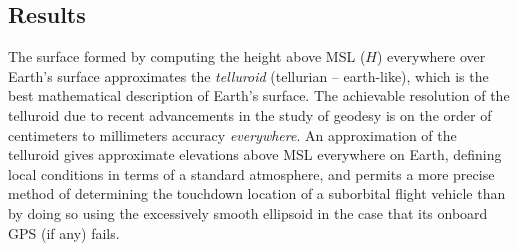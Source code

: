 \documentclass[11pt,dvipsnames]{thesis}
\begin{document}
\subsection{Results}
The surface formed by computing the height above MSL ($H$) everywhere over Earth's surface approximates the \textit{telluroid} (tellurian -- earth-like), which is the best mathematical description of Earth's surface. The achievable resolution of the telluroid due to recent advancements in the study of geodesy is on the order of centimeters to millimeters accuracy \textit{everywhere}. 
An approximation of the telluroid gives approximate elevations above MSL everywhere on Earth, defining local conditions in terms of a standard atmosphere, and 
permits a more precise method of determining the touchdown location of a suborbital flight vehicle than by doing so using the excessively smooth ellipsoid in the case that its onboard GPS (if any) fails.
\end{document}
